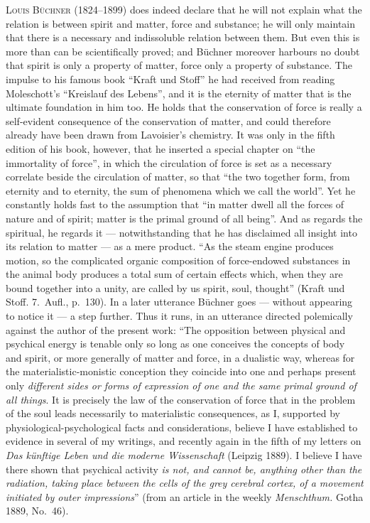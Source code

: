 \documentclass[12pt,a4paper]{book}
\newcommand{\opage}[1]{\marginnote{\footnotesize\textit{[#1]}}}
\begin{document}
\textsc{Louis Büchner} (1824--1899) does indeed declare that he will not explain
what the relation is between spirit and matter, force and substance; he will
only maintain that there is a necessary and indissoluble relation between them.
But even this is more \opage{504}than can be scientifically proved; and Büchner moreover
harbours no doubt that spirit is only a property of matter, force only a
property of substance. The impulse to his famous book ``Kraft und Stoff'' he had
received from reading Moleschott's ``Kreislauf des Lebens'', and it is the
eternity of matter that is the ultimate foundation in him too. He holds that the
conservation of force is really a self-evident consequence of the conservation
of matter, and could therefore already have been drawn from Lavoisier's
chemistry. It was only in the fifth edition of his book, however, that he
inserted a special chapter on ``the immortality of force'', in which the
circulation of force is set as a necessary correlate beside the circulation of
matter, so that ``the two together form, from eternity and to eternity, the sum
of phenomena which we call the world''. Yet he constantly holds fast to the
assumption that ``in matter dwell all the forces of nature and of spirit; matter
is the primal ground of all being''. And as regards the spiritual, he regards it
--- notwithstanding that he has disclaimed all insight into its relation to
matter --- as a mere product. ``As the steam engine produces motion, so the
complicated organic composition of force-endowed substances in the animal body
produces a total sum of certain effects which, when they are bound together into
a unity, are called by us spirit, soul, thought'' (Kraft und Stoff. 7.~Aufl.,
p.~130). In a later utterance Büchner goes --- without appearing to notice it
--- a step further. Thus it runs, in an utterance directed polemically against
the author of the present work: ``The opposition between physical and psychical
energy is tenable only so long as one conceives the concepts of body and spirit,
or more generally of matter and force, in a dualistic way, whereas for the
materialistic-monistic conception they coincide into one and perhaps present
only \emph{different sides or forms of expression of one and the same primal
ground of all things}. It is precisely the law of the conservation of force that
in the problem of the soul leads necessarily to materialistic consequences, as
I, supported by physiological-psychological facts and considerations, believe I
have established to evidence in several of my writings, and recently again in
the fifth of my letters on \textit{Das künftige Leben \opage{505}und die moderne
Wissenschaft} (Leipzig 1889). I believe I have there shown that psychical
activity \emph{is not, and cannot be, anything other than the radiation, taking
place between the cells of the grey cerebral cortex, of a movement initiated by
outer impressions}'' (from an article in the weekly \textit{Menschthum.} Gotha
1889, No.~46).
\end{document}
